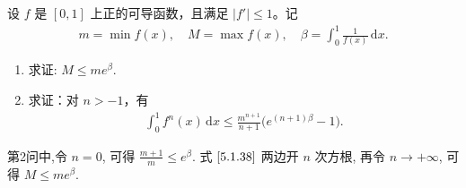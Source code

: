 \documentclass[../../main.tex]{subfiles}%
\begin{document}
\begin{example}
设 \( f \) 是 \([0,1]\) 上正的可导函数，且满足 \(|f'| \leqslant 1\)。记  
\begin{align}
m = \min f(x), \quad M = \max f(x), \quad \beta = \int_{0}^{1} \frac{1}{f(x)} \, \mathrm{d}x. \label{5.1.37}
\end{align}
\begin{enumerate}
\item 求证: \( M \leqslant m e^{\beta} \).

\item 求证：对 \( n > -1 \)，有  
\begin{align}
\int_{0}^{1} f^n(x) \, \mathrm{d}x \leqslant \frac{m^{n + 1}}{n + 1} \big( e^{(n + 1)\beta} - 1 \big). \label{5.1.38}
\end{align}  
\end{enumerate}  
\end{example}
\begin{remark}
第2问中,令 \( n = 0 \), 可得 \( \frac{m + 1}{m} \leqslant e^{\beta} \). 式 \(\eqref{5.1.38}\) 两边开 \( n \) 次方根, 再令 \( n \to +\infty \), 可得 \( M \leqslant m e^{\beta} \).
\end{remark}
\end{document}
